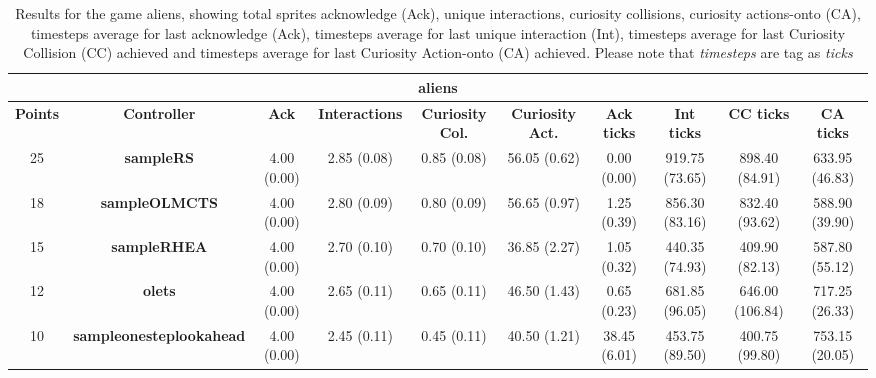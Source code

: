 \begin{table*}[!t]
\begin{center}
\begin{adjustbox}{width=1\textwidth}
\begin{tabular}{|c|c|c|c|c|c|c|c|c|c|}
\multicolumn{10}{c}{\textbf{aliens}}\\
\hline
\textbf{Points} & \textbf{Controller} & \textbf{Ack} & \textbf{Interactions} & \textbf{Curiosity Col.} & \textbf{Curiosity Act.} & \textbf{Ack ticks} & \textbf{Int ticks} & \textbf{CC ticks} & \textbf{CA ticks}\\
\hline
25 & \textbf{sampleRS} & 4.00 (0.00) & 2.85 (0.08) & 0.85 (0.08) & 56.05 (0.62) & 0.00 (0.00) & 919.75 (73.65) & 898.40 (84.91) & 633.95 (46.83)
 \\
\hline
18 & \textbf{sampleOLMCTS} & 4.00 (0.00) & 2.80 (0.09) & 0.80 (0.09) & 56.65 (0.97) & 1.25 (0.39) & 856.30 (83.16) & 832.40 (93.62) & 588.90 (39.90)
 \\
\hline
15 & \textbf{sampleRHEA} & 4.00 (0.00) & 2.70 (0.10) & 0.70 (0.10) & 36.85 (2.27) & 1.05 (0.32) & 440.35 (74.93) & 409.90 (82.13) & 587.80 (55.12)
 \\
\hline
12 & \textbf{olets} & 4.00 (0.00) & 2.65 (0.11) & 0.65 (0.11) & 46.50 (1.43) & 0.65 (0.23) & 681.85 (96.05) & 646.00 (106.84) & 717.25 (26.33)
 \\
\hline
10 & \textbf{sampleonesteplookahead} & 4.00 (0.00) & 2.45 (0.11) & 0.45 (0.11) & 40.50 (1.21) & 38.45 (6.01) & 453.75 (89.50) & 400.75 (99.80) & 753.15 (20.05)
 \\
\hline
\end{tabular}
\end{adjustbox}
\caption{Results for the game aliens, showing total sprites acknowledge (Ack), unique interactions, curiosity collisions, curiosity actions-onto (CA), timesteps average for last acknowledge (Ack),  timesteps average for last unique interaction (Int), timesteps average for last Curiosity Collision (CC) achieved and timesteps average for last Curiosity Action-onto (CA) achieved. Please note that \textit{timesteps} are tag as \textit{ticks}}
\label{tab:weights}
\end{center}
\end{table*}
